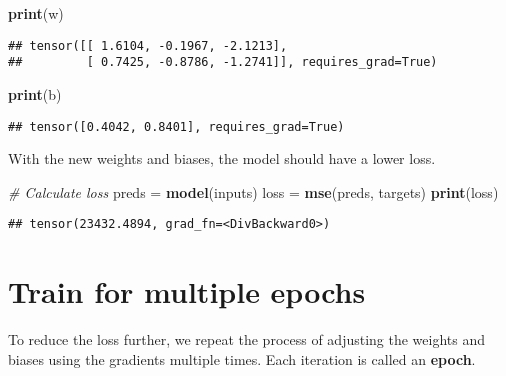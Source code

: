 \documentclass[]{book}
\newenvironment{Shaded}{\begin{snugshade}}{\end{snugshade}}
\newcommand{\CommentTok}[1]{\textcolor[rgb]{0.56,0.35,0.01}{\textit{#1}}}
\newcommand{\KeywordTok}[1]{\textcolor[rgb]{0.13,0.29,0.53}{\textbf{#1}}}
\newcommand{\NormalTok}[1]{#1}
\newcommand{\StringTok}[1]{\textcolor[rgb]{0.31,0.60,0.02}{#1}}
\begin{document}
\begin{Shaded}
\begin{Highlighting}[]
\KeywordTok{print}\NormalTok{(w)}
\end{Highlighting}
\end{Shaded}

\begin{verbatim}
## tensor([[ 1.6104, -0.1967, -2.1213],
##         [ 0.7425, -0.8786, -1.2741]], requires_grad=True)
\end{verbatim}

\begin{Shaded}
\begin{Highlighting}[]
\KeywordTok{print}\NormalTok{(b)}
\end{Highlighting}
\end{Shaded}

\begin{verbatim}
## tensor([0.4042, 0.8401], requires_grad=True)
\end{verbatim}

With the new weights and biases, the model should have a lower loss.

\begin{Shaded}
\begin{Highlighting}[]
\CommentTok{# Calculate loss}
\NormalTok{preds =}\StringTok{ }\KeywordTok{model}\NormalTok{(inputs)}
\NormalTok{loss =}\StringTok{ }\KeywordTok{mse}\NormalTok{(preds, targets)}
\KeywordTok{print}\NormalTok{(loss)}
\end{Highlighting}
\end{Shaded}

\begin{verbatim}
## tensor(23432.4894, grad_fn=<DivBackward0>)
\end{verbatim}

\hypertarget{train-for-multiple-epochs}{%
\section{Train for multiple epochs}\label{train-for-multiple-epochs}}

To reduce the loss further, we repeat the process of adjusting the weights and biases using the gradients multiple times. Each iteration is called an \textbf{epoch}.
\end{document}
